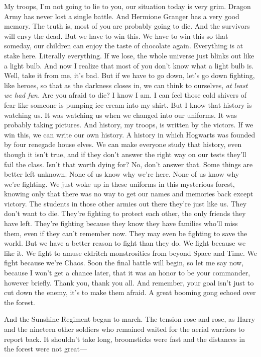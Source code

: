 My troops, I'm not going to lie to you, our situation today is very grim.
Dragon Army has never lost a single battle. And Hermione Granger{\el} has a
very good memory. The truth is, most of you are probably going to die. And the
survivors will envy the dead. But we have to win this. We have to win this so
that someday, our children can enjoy the taste of chocolate again. Everything
is at stake here. Literally everything. If we lose, the whole universe just
blinks out like a light bulb. And now I realize that most of you don't know
what a light bulb is. Well, take it from me, it's bad. But if we have to go
down, let's go down fighting, like heroes, so that as the darkness closes in,
we can think to ourselves, \emph{at least we had fun.} Are you afraid to die? I
know I am. I can feel those cold shivers of fear like someone is pumping ice
cream into my shirt. But I know{\el} that history is watching us. It was
watching us when we changed into our uniforms. It was probably taking pictures.
And history, my troops, is written by the victors. If we win this, we can write
our own history. A history in which Hogwarts was founded by four renegade house
elves. We can make everyone study that history, even though it isn't true, and
if they don't answer the right way on our tests{\el} they'll fail the class.
Isn't that worth dying for? No, don't answer that. Some things are better left
unknown. None of us know why we're here. None of us know why we're fighting. We
just woke up in these uniforms in this mysterious forest, knowing only that
there was no way to get our names and memories back except victory. The
students in those other armies out there{\el} they're just like us. They
don't want to die. They're fighting to protect each other, the only friends
they have left. They're fighting because they know they have families who'll
miss them, even if they can't remember now. They may even be fighting to save
the world. But we have a better reason to fight than they do. We fight because
we like it. We fight to amuse eldritch monstrosities from beyond Space and
Time. We fight because we're Chaos. Soon the final battle will begin, so let me
say now, because I won't get a chance later, that it was an honor to be your
commander, however briefly. Thank you, thank you all. And remember, your goal
isn't just to cut down the enemy, it's to make them afraid.
\sbreak
A great booming gong echoed over the forest.

And the Sunshine Regiment began to march.
\sbreak
The tension rose and rose, as Harry and the nineteen other soldiers who
remained waited for the aerial warriors to report back. It shouldn't take long,
broomsticks were fast and the distances in the forest were not great\mbox{---}

